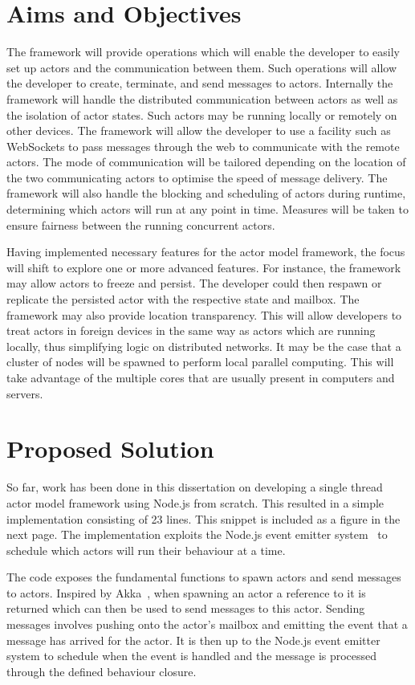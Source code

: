 \documentclass[12pt]{article}
\begin{document}
\section{Aims and Objectives}
The framework will provide operations which will enable the developer to easily set up actors and the communication between them. Such operations will allow the developer to create, terminate, and send messages to actors. Internally the framework will handle the distributed communication between actors as well as the isolation of actor states. Such actors may be running locally or remotely on other devices. The framework will allow the developer to use a facility such as WebSockets to pass messages through the web to communicate with the remote actors. The mode of communication will be tailored depending on the location of the two communicating actors to optimise the speed of message delivery. The framework will also handle the blocking and scheduling of actors during runtime, determining which actors will run at any point in time. Measures will be taken to ensure fairness between the running concurrent actors.

Having implemented necessary features for the actor model framework, the focus will shift to explore one or more advanced features. For instance, the framework may allow actors to freeze and persist. The developer could then respawn or replicate the persisted actor with the respective state and mailbox. The framework may also provide location transparency. This will allow developers to treat actors in foreign devices in the same way as actors which are running locally, thus simplifying logic on distributed networks. It may be the case that a cluster of nodes will be spawned to perform local parallel computing. This will take advantage of the multiple cores that are usually present in computers and servers.
\section{Proposed Solution}
So far, work has been done in this dissertation on developing a single thread actor model framework using Node.js from scratch. This resulted in a simple implementation consisting of 23 lines. This snippet is included as a figure in the next page. The implementation exploits the Node.js event emitter system~\cite{nodeevents} to schedule which actors will run their behaviour at a time.

The code exposes the fundamental functions to spawn actors and send messages to actors. Inspired by Akka~\cite{stivan2015akka}, when spawning an actor a reference to it is returned which can then be used to send messages to this actor. Sending messages involves pushing onto the actor's mailbox and emitting the event that a message has arrived for the actor. It is then up to the Node.js event emitter system to schedule when the event is handled and the message is processed through the defined behaviour closure.
\end{document}
